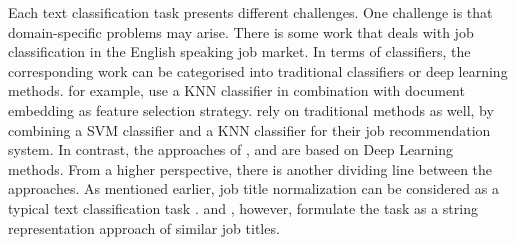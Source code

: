 \documentclass[a4paper]{article}
\begin{document}
Each text classification task presents different challenges. One challenge is that domain-specific problems may arise. There is some work that deals with job classification in the English speaking job market. 
In terms of classifiers, the corresponding work can be categorised into traditional classifiers or deep learning methods. \cite{Zhu2017} for example, use a KNN classifier in combination with document embedding as feature selection strategy. \cite{Javed2015} rely on traditional methods as well, by combining a SVM classifier and a KNN classifier for their job recommendation system. In contrast, the approaches of \cite{Decorte2021}, \cite{WangJ2019} and \cite{Neculoiu2016} are based on Deep Learning methods. From a higher perspective, there is another dividing line between the approaches. As mentioned earlier, job title normalization can be considered as a typical text classification task \citep{WangJ2019, Javed2015, Zhu2017}. \cite{Decorte2021} and \cite{Neculoiu2016}, however, formulate the task as a string representation approach of similar job titles.  
\end{document}
